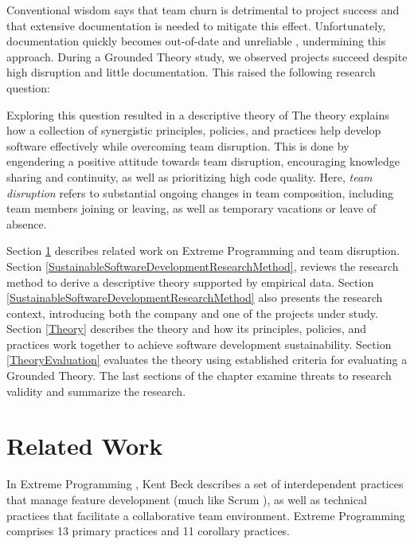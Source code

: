 Conventional wisdom says that team churn is detrimental to project success and that extensive documentation is needed to mitigate this effect. Unfortunately, documentation quickly becomes out-of-date and unreliable \cite{Lethbridge2003Documentation}, undermining this approach. During a Grounded Theory study, we observed projects succeed despite high disruption and little documentation. This raised the following research question: 

Exploring this question resulted in a descriptive theory of  The theory explains how a collection of synergistic principles, policies, and practices help develop software effectively while overcoming team disruption. This is done by engendering a positive attitude towards team disruption, encouraging knowledge sharing and continuity, as well as prioritizing high code quality. Here, \textit{team disruption} refers to substantial ongoing changes in team composition, including team members joining or leaving, as well as temporary vacations or leave of absence. 

Section \ref{SustainableSoftwareDevelopmentRelatedWork} describes related work on Extreme Programming and team disruption. Section \ref{SustainableSoftwareDevelopmentResearchMethod}, reviews the research method to derive a descriptive theory supported by empirical data. Section \ref{SustainableSoftwareDevelopmentResearchMethod} also presents the research context, introducing both the company and one of the \numberOfObservedProjects{} projects under study. Section \ref{Theory} describes the theory and how its principles, policies, and practices work together to achieve software development sustainability. Section \ref{TheoryEvaluation} evaluates the theory using established criteria for evaluating a Grounded Theory. The last sections of the chapter examine threats to research validity and summarize the research.
\section{Related Work}
\label{SustainableSoftwareDevelopmentRelatedWork}
In Extreme Programming \cite{BeckExtremeProgramming2004}, Kent Beck describes a set of interdependent practices that manage feature development (much like Scrum \cite{SchwaberScrum}), as well as technical practices that facilitate a collaborative team environment. Extreme Programming comprises 13 primary practices and 11 corollary practices. 

